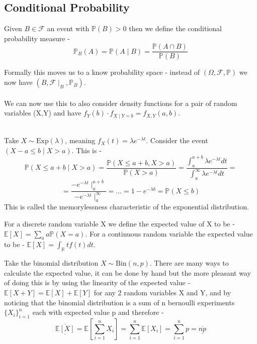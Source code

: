 \documentclass[../main.tex]{subfiles}
\begin{document}
\subsection{Conditional Probability}
\begin{definition} Given $B\in\mathcal{F}$ an event with $\mathbb{P}(B)>0$ then we define the conditional probability measure - 
\[
    \mathbb{P}_B(A)=\mathbb{P}(A\mid B)=\frac{\mathbb{P}(A\cap B)}{\mathbb{P}(B)}
\]
\end{definition}
Formally this moves us to a know probability space - instead of $(\Omega,\mathcal{F},\mathbb{P})$ we now have $(B,\mathcal{F}\mid_{B}, \mathbb{P}_B)$. \\\\
We can now use this to also consider density functions for a pair of random variables (X,Y) and have $f_Y(b)\cdot f_{X\mid Y=b} = f_{X,Y}(a,b)$. \\\\
\begin{example} Take $X\sim\text{Exp}(\lambda)$, meaning $f_X(t)=\lambda e^{-\lambda t}$. Consider the event $(X-a\leq b\mid X>a)$. This is - 
\[\mathbb{P}(X\leq a+b\mid X>a) = \frac{\mathbb{P}(X\leq a+b, X>a)}{\mathbb{P}(X>a)} = \frac{\int_a^{a+b} \lambda e^{-\lambda t }dt}{\int_a^\infty \lambda e^{-\lambda t }dt}=\]\[=\frac{-e^{-\lambda t}\mid_a^{a+b}}{-e^{-\lambda t}\mid_a^\infty} =\dots=1-e^{-\lambda b} = \mathbb{P}(X\leq b)\]
This is called the memorylessness characteristic of the exponential distribution. \end{example}
\begin{definition} For a discrete random variable X we define the expected value of X to be - $\mathbb{E}[X] = \sum_a a\mathbb{P}(X=a)$. 
For a continuous random variable the expected value to be - $\mathbb{E}[X]=\int_{\mathbb{R}} tf(t) dt$. \end{definition}
\begin{example} Take the binomial distribution $X\sim\text{Bin}(n,p)$. There are many ways to calculate the expected value, it can be done by hand but the more pleasant way of doing this is by using the linearity of the expected value - $\mathbb{E}[X+Y] = \mathbb{E}[X]+\mathbb{E}[Y]$ for any 2 random variables X and Y, and by noticing that the binomial distribution is a sum of n bernoulli experiments $\{X_i\}_{i=1}^n$ each with expected value p and therefore - 
\[\overline{\underline{\mathbb{E}\left[X\right]}} = \mathbb{E}[\sum_{i=1}^n X_i] = \sum_{i=1}^n\mathbb{E}[X_i] = \sum_{i=1}^n p = \overline{\underline{np}}\]
\end{example}
\end{document}
